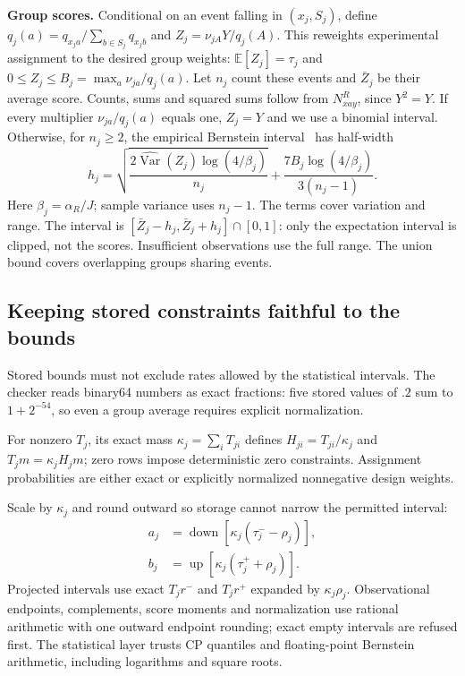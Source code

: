 \documentclass[conference]{IEEEtran}
\newcommand{\E}{\mathbb{E}}
\begin{document}
\textbf{Group scores.} Conditional on an event falling in $(x_j,S_j)$, define $q_j(a)=q_{x_ja}/\sum_{b\in S_j}q_{x_jb}$ and $Z_j=\nu_{jA}Y/q_j(A)$. This reweights experimental assignment to the desired group weights: $\E[Z_j]=\tau_j$ and $0\le Z_j\le B_j=\max_a\nu_{ja}/q_j(a)$. Let $n_j$ count these events and $\bar Z_j$ be their average score. Counts, sums and squared sums follow from $N^R_{xay}$, since $Y^2=Y$. If every multiplier $\nu_{ja}/q_j(a)$ equals one, $Z_j=Y$ and we use a binomial interval. Otherwise, for $n_j\ge2$, the empirical Bernstein interval~\cite{maurer2009eb} has half-width
\begin{equation}
 h_j=\sqrt{\frac{2\widehat{\operatorname{Var}}(Z_j)\log(4/\beta_j)}{n_j}}
 +\frac{7B_j\log(4/\beta_j)}{3(n_j-1)}.\label{eq:eb}
\end{equation}
Here $\beta_j=\alpha_R/J$; sample variance uses $n_j-1$. The terms cover variation and range. The interval is $[\bar Z_j-h_j,\bar Z_j+h_j]\cap[0,1]$: only the expectation interval is clipped, not the scores. Insufficient observations use the full range. The union bound covers overlapping groups sharing events.



\subsection{Keeping stored constraints faithful to the bounds}
Stored bounds must not exclude rates allowed by the statistical intervals. The checker reads binary64 numbers as exact fractions: five stored values of $.2$ sum to $1+2^{-54}$, so even a group average requires explicit normalization.

For nonzero $T_j$, its exact mass $\kappa_j=\sum_iT_{ji}$ defines $H_{ji}=T_{ji}/\kappa_j$ and $T_jm=\kappa_jH_jm$; zero rows impose deterministic zero constraints. Assignment probabilities are either exact or explicitly normalized nonnegative design weights.

Scale by $\kappa_j$ and round outward so storage cannot narrow the permitted interval:
\begin{align}
 a_j&=\operatorname{down}\!\left[\kappa_j(\tau_j^- -\rho_j)\right],\nonumber\\
 b_j&=\operatorname{up}\!\left[\kappa_j(\tau_j^+ +\rho_j)\right].\label{eq:represented}
\end{align}
Projected intervals use exact $T_jr^-$ and $T_jr^+$ expanded by $\kappa_j\rho_j$. Observational endpoints, complements, score moments and normalization use rational arithmetic with one outward endpoint rounding; exact empty intervals are refused first. The statistical layer trusts CP quantiles and floating-point Bernstein arithmetic, including logarithms and square roots.
\end{document}
